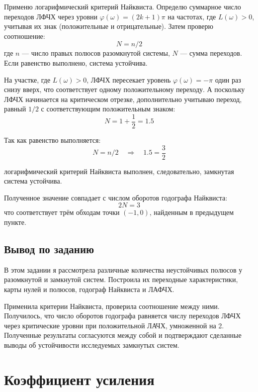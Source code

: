 \documentclass[a4paper,12pt]{article}
\begin{document}
	Применю логарифмический критерий Найквиста.	Определю суммарное число переходов ЛФЧХ через уровни
	$\varphi(\omega)=(2k+1)\pi$ на частотах, где $L(\omega)>0$,
	учитывая их знак (положительные и отрицательные).
	Затем проверю соотношение:
	\[
	N = n/2
	\]
	где $n$ — число правых полюсов разомкнутой системы,
	$N$ — сумма переходов. Если равенство выполнено, система устойчива.
	
	На участке, где $L(\omega)>0$, ЛФЧХ пересекает уровень
	$\varphi(\omega)=-\pi$ один раз снизу вверх,
	что соответствует одному положительному переходу. А поскольку ЛФЧХ начинается на критическом отрезке,
	дополнительно учитываю переход, равный $1/2$ с соответствующим положительным знаком:	
	\[
	N = 1 + \frac{1}{2} = 1.5
	\]
	
	Так как равенство выполняется:
	\[N = n/2 \quad \Longrightarrow \quad 1.5 = \frac{3}{2}\]
	
	
	логарифмический критерий Найквиста выполнен, следовательно, замкнутая система устойчива.
	
	Полученное значение совпадает с числом оборотов годографа Найквиста:
	\[
	2N = 3
	\]
	что соответствует трём обходам точки $(-1,0)$,
	найденным в предыдущем пункте.
	
	\newpage
	\subsection{Вывод по заданию}
	
	В этом задании я рассмотрела различные количества неустойчивых полюсов у разомкнутой и замкнутой систем. Построила их переходные характеристики, карты нулей и полюсов, годограф Найквиста и ЛАФЧХ. 
	
	Применила критерии Найквиста, проверила соотношение между ними. Получилось, что число оборотов годографа равняется числу переходов ЛФЧХ через критические уровни при положительной ЛАЧХ, умноженной на 2. Полученные результаты согласуются между собой и подтверждают сделанные выводы об устойчивости исследуемых замкнутых систем.

	
	
	
	
	
	
	
	
	
	
	
	
	
	
	
	
	
	
	
	
	\newpage
	\section{Коэффициент усиления}
	
\end{document}

